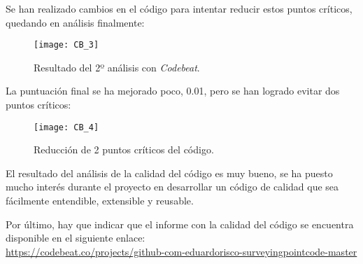 Se han realizado cambios en el código para intentar reducir estos puntos críticos, quedando en análisis finalmente:

\begin{figure}[!h]
	\centering
	\texttt{[image: CB\_3]}
	\caption{Resultado del 2º análisis con \emph{Codebeat}.}
	\label{fig:CB_3}
\end{figure}

La puntuación final se ha mejorado poco, 0.01, pero se han logrado evitar dos puntos críticos:

\begin{figure}[!h]
	\centering
	\texttt{[image: CB\_4]}
	\caption{Reducción de 2 puntos críticos del código.}
	\label{fig:CB_4}
\end{figure}

El resultado del análisis de la calidad del código es muy bueno, se ha puesto mucho interés durante el proyecto en desarrollar un código de calidad que sea fácilmente entendible, extensible y reusable.

Por último, hay que indicar que el informe con la calidad del código se encuentra disponible en el siguiente enlace:\\
 \url{https://codebeat.co/projects/github-com-eduardorisco-surveyingpointcode-master}
 